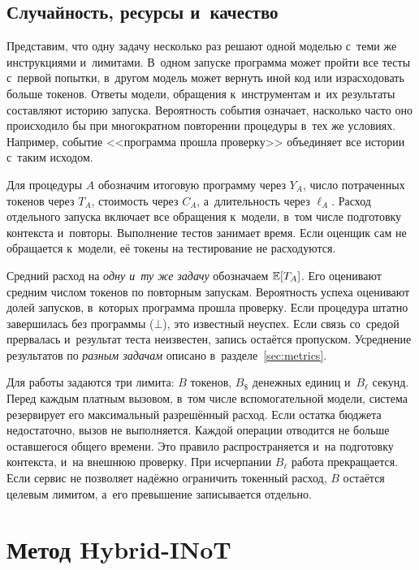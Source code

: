 \subsection{Случайность, ресурсы и~качество}
Представим, что одну задачу несколько раз решают одной моделью с~теми же инструкциями и~лимитами. В~одном запуске программа может пройти все тесты с~первой попытки, в~другом модель может вернуть иной код или израсходовать больше токенов. Ответы модели, обращения к~инструментам и~их результаты составляют историю запуска. Вероятность события означает, насколько часто оно происходило бы при многократном повторении процедуры в~тех же условиях. Например, событие <<программа прошла проверку>> объединяет все истории с~таким исходом.

Для процедуры $A$ обозначим итоговую программу через $Y_A$, число потраченных токенов через $T_A$, стоимость через $C_A$, а~длительность через $\ell_A$. Расход отдельного запуска включает все обращения к~модели, в~том числе подготовку контекста и~повторы. Выполнение тестов занимает время. Если оценщик сам не обращается к~модели, её токены на тестирование не расходуются.

Средний расход на \emph{одну и~ту же задачу} обозначаем $\mathbb{E}[T_A]$. Его оценивают средним числом токенов по повторным запускам. Вероятность успеха оценивают долей запусков, в~которых программа прошла проверку. Если процедура штатно завершилась без программы ($\bot$), это известный неуспех. Если связь со~средой прервалась и~результат теста неизвестен, запись остаётся пропуском. Усреднение результатов по \emph{разным задачам} описано в~разделе~\ref{sec:metrics}.

Для работы задаются три лимита: $B$ токенов, $B_{\$}$ денежных единиц и~$B_{\ell}$ секунд. Перед каждым платным вызовом, в~том числе вспомогательной модели, система резервирует его максимальный разрешённый расход. Если остатка бюджета недостаточно, вызов не выполняется. Каждой операции отводится не больше оставшегося общего времени. Это правило распространяется и~на подготовку контекста, и~на внешнюю проверку. При исчерпании $B_{\ell}$ работа прекращается. Если сервис не позволяет надёжно ограничить токенный расход, $B$ остаётся целевым лимитом, а~его превышение записывается отдельно.



\section{Метод Hybrid-INoT}\label{sec:method}
